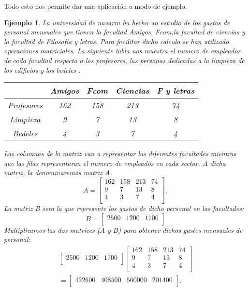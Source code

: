 \documentclass[b5paper, 11pt]{book}
\newcommand{\0}{\mathbf{0}}
\theoremstyle{estiloB}
\theoremstyle{estiloC}
\theoremstyle{estiloD}
\theoremstyle{estiloE}
\newtheorem{ejem}{Ejemplo}[chapter]
\begin{document}
Todo esto nos permite dar una aplicación a modo de ejemplo.
\begin{ejem}
 La universidad de navarra ha hecho un estudio de los gastos de personal mensuales que tienen la facultad Amigos, Fcom,la facultad de ciencias y la facultad de Filosof\'{i}a y letras. Para facilitar dicho calculo se han utilizado operaciones matriciales. La siguiente tabla nos muestra el numero de empleados de cada facultad respecto a los profesores, las personas dedicadas a la limpieza de los edificios y los bedeles .
\begin{center}
\begin{tabular}{|c|c|c|c|c|}
 \hline 
 \rule[-1ex]{0pt}{2.5ex} &          Amigos &     Fcom &      Ciencias &    F  y letras \\ 
 \hline 
 \rule[-1ex]{0pt}{2.5ex} Profesores  & 162 & 158 & 213 & 74 \\ 
 \hline 
 \rule[-1ex]{0pt}{2.5ex} Limpieza & 9 & 7 & 13 & 8 \\ 
 \hline 
 \rule[-1ex]{0pt}{2.5ex} Bedeles  & 4 & 3 & 7 & 4 \\ 
 \hline 
 \end{tabular}  
\end{center} 
Las columnas de la matriz van a representar las diferentes facultades mientras que las filas representaran el numero de empleados en cada sector. $A$ dicha matriz, la denominaremos matriz $A$.
\begin{equation*}
 A = \begin{bmatrix}
 162 &  158 & 213 & 74 \\
 9 &  7 & 13  &  8  \\
 4 &  3 & 7  &  4 \\
\end{bmatrix},
\end{equation*}
La matriz B sera la que represente los gastos de dicho personal en las facultades:
\begin{equation*}
 B = \begin{bmatrix}
 2500 &  1200 & 1700 \\
\end{bmatrix}
\end{equation*}
Multiplicamos las dos matrices ($A$ y $B$) para obtener dichos gastos mensuales de personal:
\begin{multline*}
\begin{bmatrix} 
 2500 &  1200 & 1700 \\
 \end{bmatrix}
\begin{bmatrix}
 162 & 158 & 213 & 74 \\
  9 & 7  & 13 &  8 \\
  4 & 3  & 7  &  4 \\
\end{bmatrix} 
\\=\begin{bmatrix}
 422600 & 408500 & 560000 & 201400 \\
 \end{bmatrix}.
\end{multline*}






\end{ejem}
\end{document}
